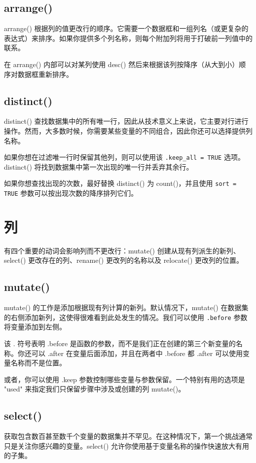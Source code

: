 \subsection{arrange()}
arrange() 根据列的值更改行的顺序。它需要一个数据框和一组列名（或更复杂的表达式）来排序。如果你提供多个列名称，则每个附加列将用于打破前一列值中的联系。

在 arrange() 内部可以对某列使用 desc() 然后来根据该列按降序（从大到小）顺序对数据框重新排序。
\subsection{distinct()}
distinct() 查找数据集中的所有唯一行，因此从技术意义上来说，它主要对行进行操作。然而，大多数时候，你需要某些变量的不同组合，因此你还可以选择提供列名称。

如果你想在过滤唯一行时保留其他列，则可以使用该 \verb|.keep_all = TRUE| 选项。distinct() 将找到数据集中第一次出现的唯一行并丢弃其余行。

如果你想查找出现的次数，最好替换 distinct() 为 count()，并且使用 \verb|sort = TRUE| 参数可以按出现次数的降序排列它们。

\section{列}
有四个重要的动词会影响列而不更改行：mutate() 创建从现有列派生的新列、select() 更改存在的列、rename() 更改列的名称以及 relocate() 更改列的位置。

\subsection{mutate()}
mutate() 的工作是添加根据现有列计算的新列。默认情况下，mutate() 在数据集的右侧添加新列，这使得很难看到此处发生的情况。我们可以使用 \verb|.before| 参数将变量添加到左侧。

该 . 符号表明 .before 是函数的参数，而不是我们正在创建的第三个新变量的名称。你还可以 .after 在变量后面添加，并且在两者中 .before 都 .after 可以使用变量名称而不是位置。

或者，你可以使用 .keep 参数控制哪些变量与参数保留。一个特别有用的选项是 "used" 来指定我们只保留步骤中涉及或创建的列 mutate()。

\subsection{select()}
获取包含数百甚至数千个变量的数据集并不罕见。在这种情况下，第一个挑战通常只是关注你感兴趣的变量。select() 允许你使用基于变量名称的操作快速放大有用的子集。

